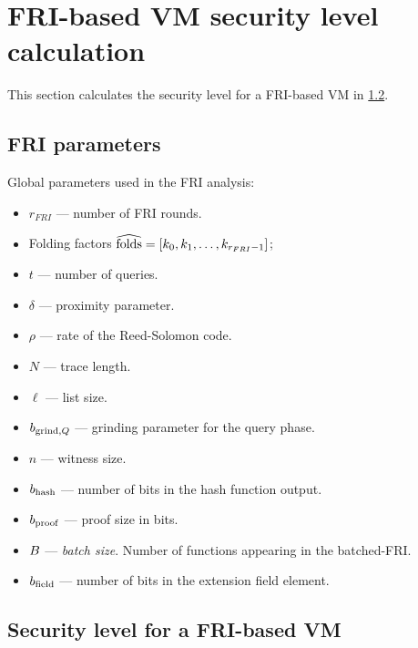 \newpage
\section{FRI-based VM security level calculation}

This section calculates the security level for a FRI-based VM in \cref{sec:fri_security_level}.

\subsection{FRI parameters}

Global parameters used in the FRI analysis:
\begin{itemize}
    \item $r_{FRI}$ --- number of FRI rounds.
    \item Folding factors $\widehat{\mathrm{folds}}=[k_0,k_1,\ldots,k_{r_{FRI}-1}]$;
    \item $t$ --- number of queries.
    \item $\delta$ --- proximity parameter.
    \item $\rho$ --- rate of the Reed-Solomon code.
    \item $N$ --- trace length.
    \item $\ell$ --- list size.
    \item $b_{\mathrm{grind},Q}$ --- grinding parameter for the query phase.
    \item $n$ --- witness size.
    \item $b_{\mathrm{hash}}$ --- number of bits in the hash function output.
    \item $b_{\mathrm{proof}}$ --- proof size in bits.
    \item $B$ --- \emph{batch size}. Number of functions appearing in the batched-FRI.
    \item $b_{\mathrm{field}}$ --- number of bits in the extension field element.
\end{itemize}




\subsection{Security level for a FRI-based VM}\label{sec:fri_security_level}

